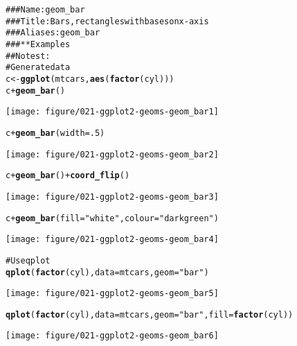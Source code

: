 \documentclass[a4paper,titlepage]{tufte-handout}\usepackage{graphicx, color}
\makeatletter
\def\maxwidth{ %
  \ifdim\Gin@nat@width>\linewidth
    \linewidth
  \else
    \Gin@nat@width
  \fi
}
\newcommand{\hlfunctioncall}[1]{\textcolor[rgb]{0.501960784313725,0,0.329411764705882}{\textbf{#1}}}%
\newcommand{\hlstring}[1]{\textcolor[rgb]{0.6,0.6,1}{#1}}%
\newcommand{\hlcomment}[1]{\textcolor[rgb]{0.180392156862745,0.6,0.341176470588235}{#1}}%
\newenvironment{kframe}{%
 \def\at@end@of@kframe{}%
 \ifinner\ifhmode%
  \def\at@end@of@kframe{\end{minipage}}%
  \begin{minipage}{\columnwidth}%
 \fi\fi%
 \def\FrameCommand##1{\hskip\@totalleftmargin \hskip-\fboxsep
 \colorbox{shadecolor}{##1}\hskip-\fboxsep
     \hskip-\linewidth \hskip-\@totalleftmargin \hskip\columnwidth}%
 \MakeFramed {\advance\hsize-\width
   \@totalleftmargin\z@ \linewidth\hsize
   \@setminipage}}%
 {\par\unskip\endMakeFramed%
 \at@end@of@kframe}
\newenvironment{knitrout}{}{} %
\makeatother
\begin{document}
\begin{knitrout}
\color{fgcolor}\begin{kframe}
\begin{alltt}
\hlcomment{### Name: geom_bar}
\hlcomment{### Title: Bars, rectangles with bases on x-axis}
\hlcomment{### Aliases: geom_bar}
\hlcomment{### ** Examples}
\hlcomment{## No test: }
\hlcomment{# Generate data}
c <- \hlfunctioncall{ggplot}(mtcars, \hlfunctioncall{aes}(\hlfunctioncall{factor}(cyl)))
c + \hlfunctioncall{geom_bar}()
\end{alltt}
\end{kframe}\texttt{[image: figure/021-ggplot2-geoms-geom\_bar1]} \begin{kframe}\begin{alltt}
c + \hlfunctioncall{geom_bar}(width=.5)
\end{alltt}
\end{kframe}\texttt{[image: figure/021-ggplot2-geoms-geom\_bar2]} \begin{kframe}\begin{alltt}
c + \hlfunctioncall{geom_bar}() + \hlfunctioncall{coord_flip}()
\end{alltt}
\end{kframe}\texttt{[image: figure/021-ggplot2-geoms-geom\_bar3]} \begin{kframe}\begin{alltt}
c + \hlfunctioncall{geom_bar}(fill=\hlstring{"white"}, colour=\hlstring{"darkgreen"})
\end{alltt}
\end{kframe}\texttt{[image: figure/021-ggplot2-geoms-geom\_bar4]} \begin{kframe}\begin{alltt}
\hlcomment{# Use qplot}
\hlfunctioncall{qplot}(\hlfunctioncall{factor}(cyl), data=mtcars, geom=\hlstring{"bar"})
\end{alltt}
\end{kframe}\texttt{[image: figure/021-ggplot2-geoms-geom\_bar5]} \begin{kframe}\begin{alltt}
\hlfunctioncall{qplot}(\hlfunctioncall{factor}(cyl), data=mtcars, geom=\hlstring{"bar"}, fill=\hlfunctioncall{factor}(cyl))
\end{alltt}
\end{kframe}\texttt{[image: figure/021-ggplot2-geoms-geom\_bar6]} \begin{kframe}\begin{alltt}

\end{alltt}
\end{kframe}
\end{knitrout}
\end{document}
